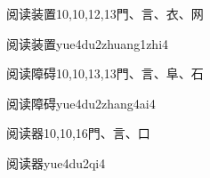 \begin{entry}{阅读装置}{10,10,12,13}{⾨、⾔、⾐、⽹}
  \begin{phonetics}{阅读装置}{yue4du2zhuang1zhi4}
  \end{phonetics}
\end{entry}

\begin{entry}{阅读障碍}{10,10,13,13}{⾨、⾔、⾩、⽯}
  \begin{phonetics}{阅读障碍}{yue4du2zhang4ai4}
  \end{phonetics}
\end{entry}

\begin{entry}{阅读器}{10,10,16}{⾨、⾔、⼝}
  \begin{phonetics}{阅读器}{yue4du2qi4}
  \end{phonetics}
\end{entry}


